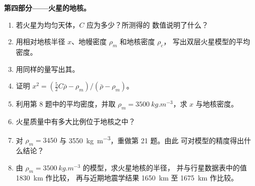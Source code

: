 \begin{problem}
\medskip
\noindent\textbf{第四部分——火星的地核。}
\begin{enumerate}[resume]
  \item 若火星为均匀天体，$C$ 应为多少？所测得的
        数值说明了什么？
  \item 用相对地核半径 $x$、地幔密度 $\rho_m$
        和地核密度 $\rho_c$，
        写出双层火星模型的平均密度。
  \item 用同样的量写出其。
  \item 证明 $x^2 = (\tfrac52C\bar\rho - \rho_m)/(\bar\rho - \rho_m)$。
  \item 利用第 8 题中的平均密度，并取 $\rho_m =
        \qty{3500}{kg.m^{-3}}$，求 $x$ 与地核密度。
  \item 火星质量中有多大比例位于地核之中？
  \item 对 $\rho_m = 3450$ 与
        \qty{3550}{kg.m^{-3}}，重做第 21 题。由此
        可对模型的精度得出什么结论？
  \item 由 $\rho_m = \qty{3500}{kg.m^{-3}}$ 的模型，求火星地核的半径，
        并与行星数据表中的值 \qty{1830}{km} 作比较，
        再与近期地震学结果 \qty{1650}{km} 至
        \qty{1675}{km} 作比较。
\end{enumerate}
\end{problem}
